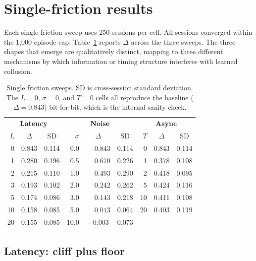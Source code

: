 \section{Single-friction results}
\label{sec:results-singles}

Each single friction sweep uses 250 sessions per cell. All sessions converged within the 1{,}000 episode cap. Table~\ref{tab:singles} reports $\Delta$ across the three sweeps. The three shapes that emerge are qualitatively distinct, mapping to three different mechanisms by which information or timing structure interferes with learned collusion.

\begin{table}[H]
\centering
\caption{Single friction sweeps. SD is cross-session standard deviation. The $L=0$, $\sigma=0$, and $T=0$ cells all reproduce the baseline ($\Delta=0.843$) bit-for-bit, which is the internal sanity check.}
\label{tab:singles}
\begin{tabular}{rcc@{\hspace{0.75em}}|@{\hspace{0.75em}}rcc@{\hspace{0.75em}}|@{\hspace{0.75em}}rcc}
\toprule
\multicolumn{3}{c}{\textbf{Latency}} & \multicolumn{3}{c}{\textbf{Noise}} & \multicolumn{3}{c}{\textbf{Async}} \\
$L$ & $\Delta$ & SD & $\sigma$ & $\Delta$ & SD & $T$ & $\Delta$ & SD \\
\midrule
0  & 0.843 & 0.114 & 0.0  & $\phantom{-}0.843$ & 0.114 & 0  & 0.843 & 0.114 \\
1  & 0.280 & 0.196 & 0.5  & $\phantom{-}0.670$ & 0.226 & 1  & 0.378 & 0.108 \\
2  & 0.215 & 0.110 & 1.0  & $\phantom{-}0.493$ & 0.290 & 2  & 0.418 & 0.095 \\
3  & 0.193 & 0.102 & 2.0  & $\phantom{-}0.242$ & 0.262 & 5  & 0.424 & 0.116 \\
5  & 0.174 & 0.086 & 3.0  & $\phantom{-}0.143$ & 0.218 & 10 & 0.411 & 0.108 \\
10 & 0.158 & 0.085 & 5.0  & $\phantom{-}0.013$ & 0.064 & 20 & 0.403 & 0.119 \\
20 & 0.155 & 0.085 & 10.0 & $-0.003$           & 0.073 &    &       &       \\
\bottomrule
\end{tabular}
\end{table}

\subsection{Latency: cliff plus floor}
\label{sec:results-latency}

